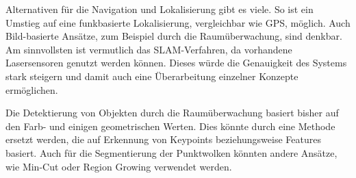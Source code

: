 Alternativen für die Navigation und Lokalisierung gibt es viele. So ist ein Umstieg auf eine funkbasierte Lokalisierung, vergleichbar wie GPS, möglich. Auch Bild-basierte Ansätze, zum Beispiel durch die Raumüberwachung, sind denkbar. Am sinnvollsten ist vermutlich das SLAM-Verfahren, da vorhandene Lasersensoren genutzt werden können. Dieses würde die Genauigkeit des Systems stark steigern und damit auch eine Überarbeitung einzelner Konzepte ermöglichen.

Die Detektierung von Objekten durch die Raumüberwachung basiert bisher auf den Farb- und einigen geometrischen Werten. Dies könnte durch eine Methode ersetzt werden, die auf Erkennung von Keypoints beziehungsweise Features basiert. Auch für die Segmentierung der Punktwolken könnten andere Ansätze, wie Min-Cut oder Region Growing verwendet werden.

